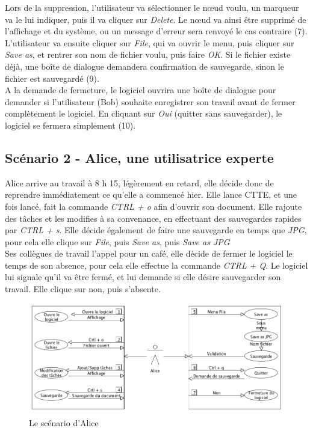 \documentclass[12pt, a4paper]{article}
\begin{document}
Lors de la suppression, l'utilisateur va sélectionner le nœud voulu, un marqueur va le lui indiquer, puis il va cliquer sur \emph{Delete}. Le nœud va ainsi être supprimé de l'affichage et du système, ou un message d'erreur sera renvoyé le cas contraire (7).\\ 


L'utilisateur va ensuite cliquer sur \emph{File}, qui va ouvrir le menu, puis cliquer sur \emph{Save as}, et rentrer son nom de fichier voulu, puis faire \emph{OK}. Si le fichier existe déjà, une boîte de dialogue demandera confirmation de sauvegarde, sinon le fichier est sauvegardé (9).\\ 


A la demande de fermeture, le logiciel ouvrira une boîte de dialogue pour demander si l'utilisateur (Bob) souhaite enregistrer son travail avant de fermer complètement le logiciel. En cliquant sur \emph{Oui} (quitter sans sauvegarder), le logiciel se fermera simplement (10). \\ \newpage
\textcolor{NavyBlue}{\subsection{Scénario 2 - Alice, une utilisatrice experte}}


Alice arrive au travail à 8 h 15, légèrement en retard, elle décide donc de reprendre immédiatement ce qu'elle a commencé hier. Elle lance CTTE, et une fois lancé, fait la commande \emph{CTRL + o} afin d'ouvrir son document. Elle rajoute des tâches et les modifies à sa convenance, en effectuant des sauvegardes rapides par \emph{CTRL + s}. Elle décide également de faire une sauvegarde en temps que \emph{JPG}, pour cela elle clique sur \emph{File}, puis \emph{Save as}, puis \emph{Save as JPG} \\


Ses collègues de travail l'appel pour un café, elle décide de fermer le logiciel le temps de son absence, pour cela elle effectue la commande \emph{CTRL + Q}. Le logiciel lui signale qu'il va être fermé, et lui demande si elle désire sauvegarder son travail. Elle clique sur non, puis s'absente.\\

\begin{figure}[h]
\begin{center}
   \includegraphics[scale = 0.4]{scenario-alice.png}
	\caption{Le scénario d'Alice}
	\end{center}
\end{figure}
\end{document}
